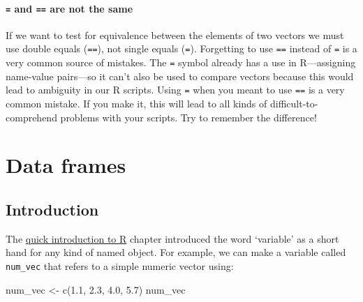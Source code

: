 \documentclass[
]{book}
\newenvironment{Shaded}{\begin{snugshade}}{\end{snugshade}}
\newcommand{\FloatTok}[1]{\textcolor[rgb]{0.00,0.00,0.81}{#1}}
\newcommand{\FunctionTok}[1]{\textcolor[rgb]{0.00,0.00,0.00}{#1}}
\newcommand{\NormalTok}[1]{#1}
\newcommand{\OtherTok}[1]{\textcolor[rgb]{0.56,0.35,0.01}{#1}}
\newenvironment{greybox}{
  \definecolor{shadecolor}{rgb}{0.95,0.95,0.95}  %
  \color{black}
  \begin{shaded}}
 {\end{shaded}}
\newenvironment{infobox}[1]
  {
  \begin{itemize}
  \renewcommand{\labelitemi}{
    \raisebox{-.7\height}[0pt][0pt]{
      {\setkeys{Gin}{width=3em,keepaspectratio}
        \texttt{[image: images/\#1]}}
    }
  }
  \setlength{\fboxsep}{1em}
  \begin{greybox}
  \item
  }
  {
  \end{greybox}
  \end{itemize}
  }
\begin{document}
\begin{infobox}{warning}

\hypertarget{and-are-not-the-same}{%
\subsubsection*{\texorpdfstring{\texttt{=} and \texttt{==} are not the same}{= and == are not the same}}\label{and-are-not-the-same}}

If we want to test for equivalence between the elements of two vectors we must use double equals (\texttt{==}), not single equals (\texttt{=}). Forgetting to use \texttt{==} instead of \texttt{=} is a very common source of mistakes. The \texttt{=} symbol already has a use in R---assigning name-value pairs---so it can't also be used to compare vectors because this would lead to ambiguity in our R scripts. Using \texttt{=} when you meant to use \texttt{==} is a very common mistake. If you make it, this will lead to all kinds of difficult-to-comprehend problems with your scripts. Try to remember the difference!

\end{infobox}

\hypertarget{data-frames}{%
\chapter{Data frames}\label{data-frames}}

\hypertarget{introduction-1}{%
\section{Introduction}\label{introduction-1}}

The \protect\hyperlink{quick-intro-to-r}{quick introduction to R} chapter introduced the word `variable' as a short hand for any kind of named object. For example, we can make a variable called \texttt{num\_vec} that refers to a simple numeric vector using:

\begin{Shaded}
\begin{Highlighting}[]
\NormalTok{num\_vec }\OtherTok{\textless{}{-}} \FunctionTok{c}\NormalTok{(}\FloatTok{1.1}\NormalTok{, }\FloatTok{2.3}\NormalTok{, }\FloatTok{4.0}\NormalTok{, }\FloatTok{5.7}\NormalTok{)}
\NormalTok{num\_vec}
\end{Highlighting}
\end{Shaded}
\end{document}
